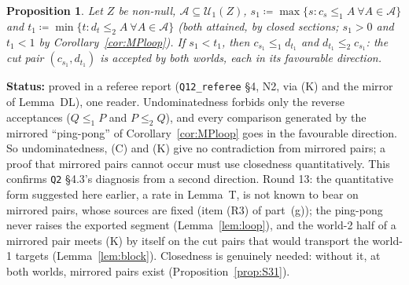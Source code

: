 \documentclass[11pt]{article}
\newtheorem{proposition}[theorem]{Proposition}
\theoremstyle{definition}
\theoremstyle{remark}
\newcommand{\src}[1]{\texttt{#1}}
\newcommand{\status}[1]{\par\smallskip\noindent\textbf{Status:} #1\par\smallskip}
\begin{document}
\begin{proposition}\label{prop:N2}
Let $Z$ be non-null, $\mathcal A\subseteq\mathcal U_1(Z)$, $s_1\coloneqq\max\{s:c_s\le_1A\ \forall A\in\mathcal A\}$ and $t_1\coloneqq\min\{t:d_t\le_2A\ \forall A\in\mathcal A\}$ (both attained, by closed sections; $s_1>0$ and $t_1<1$ by Corollary~\ref{cor:MPloop}). If $s_1<t_1$, then $c_{s_1}\le_1d_{t_1}$ and $d_{t_1}\le_2c_{s_1}$: the cut pair $(c_{s_1},d_{t_1})$ is accepted by both worlds, each in its favourable direction.
\end{proposition}
\status{proved in a referee report (\src{Q12\_referee} \S4, N2, via (K) and the mirror of Lemma~DL), one reader. Undominatedness forbids only the reverse acceptances ($Q\le_1P$ and $P\le_2Q$), and every comparison generated by the mirrored ``ping-pong'' of Corollary~\ref{cor:MPloop} goes in the favourable direction. So undominatedness, (C) and (K) give no contradiction from mirrored pairs; a proof that mirrored pairs cannot occur must use closedness quantitatively. This confirms \src{Q2} \S4.3's diagnosis from a second direction. Round 13: the quantitative form suggested here earlier, a rate in Lemma~T, is not known to bear on mirrored pairs, whose sources are fixed (item (R3) of part~(g)); the ping-pong never raises the exported segment (Lemma~\ref{lem:loop}), and the world-2 half of a mirrored pair meets (K) by itself on the cut pairs that would transport the world-1 targets (Lemma~\ref{lem:block}). Closedness is genuinely needed: without it, at both worlds, mirrored pairs exist (Proposition~\ref{prop:S31}).}
\end{document}
